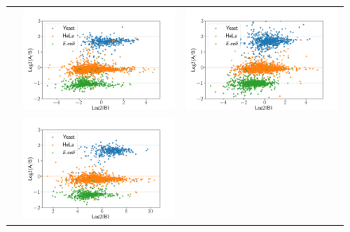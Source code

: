 \documentclass[11pt]{article}
\begin{document}
\begin{figure}[hbt]
\begin{tabular}{   >{\centering\arraybackslash} m{3cm} V V}
        {} & \includegraphics[width=\linewidth]{../../result/report_plots_pipeline/scatter_ID_msqrob2.png}  
                & \includegraphics[width=\linewidth]{../../result/report_plots_pipeline/scatter_PS_msqrob2.png} \\ 
        {} & \includegraphics[width=\linewidth]{../../result/report_plots_pipeline/scatter_ID_msstats.png}  

\end{tabular}
\end{figure}
\end{document}
